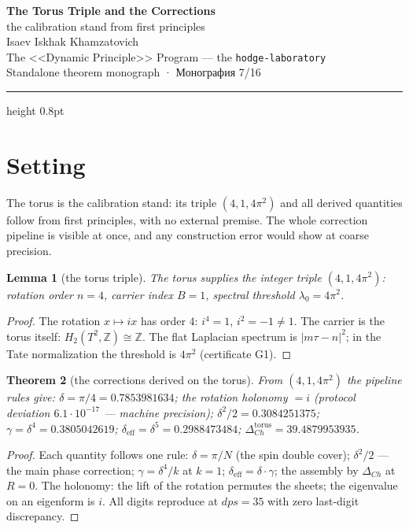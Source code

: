 \documentclass[11pt,a4paper]{article}
\theoremstyle{plain}
\newtheorem{theorem}{Theorem}
\newtheorem{lemma}[theorem]{Lemma}
\theoremstyle{definition}
\theoremstyle{remark}
\newcommand{\ZZ}{\mathbb{Z}}
\begin{document}
\begin{center}
{\LARGE\bfseries The Torus Triple and the Corrections}\\[0.4em]
{\large the calibration stand from first principles}\\[0.6em]
{\normalsize Isaev Iskhak Khamzatovich}\\[0.2em]
{\normalsize The <<Dynamic Principle>> Program --- the \texttt{hodge-laboratory}}\\[0.15em]
{\small Standalone theorem monograph · Монография 7/16}
\end{center}
\vspace{0.4em}
{\color{linkblue}\hrule height 0.8pt}
\vspace{0.8em}

\section{Setting}

The torus is the calibration stand: its triple $(4,1,4\pi^2)$ and
all derived quantities follow from first principles, with no
external premise. The whole correction pipeline is visible at once,
and any construction error would show at coarse precision.

\begin{lemma}[the torus triple]\label{lem:torus}
The torus supplies the integer triple $(4,1,4\pi^2)$: rotation
order $n=4$, carrier index $B=1$, spectral threshold
$\lambda_0=4\pi^2$.
\end{lemma}

\begin{proof}
The rotation $x\mapsto ix$ has order $4$: $i^4=1$, $i^2=-1\ne1$.
The carrier is the torus itself: $H_2(T^2,\ZZ)\cong\ZZ$. The flat
Laplacian spectrum is $|m\tau-n|^2$; in the Tate normalization the
threshold is $4\pi^2$ (certificate G1).
\end{proof}

\begin{theorem}[the corrections derived on the torus]\label{th:toruscorr}
From $(4,1,4\pi^2)$ the pipeline rules give:
$\delta=\pi/4=0.7853981634$; the rotation holonomy $=i$ (protocol
deviation $6.1\cdot10^{-17}$ --- machine precision);
$\delta^2/2=0.3084251375$; $\gamma=\delta^4=0.3805042619$;
$\delta_{\mathrm{eff}}=\delta^5=0.2988473484$;
$\Delta_{Ch}^{\mathrm{torus}}=39.4879953935$.
\end{theorem}

\begin{proof}
Each quantity follows one rule: $\delta=\pi/N$ (the spin double
cover); $\delta^2/2$ --- the main phase correction;
$\gamma=\delta^4/k$ at $k=1$; $\delta_{\mathrm{eff}}
=\delta\cdot\gamma$; the assembly by $\Delta_{Ch}$ at $R=0$. The
holonomy: the lift of the rotation permutes the sheets; the
eigenvalue on an eigenform is $i$. All digits reproduce at $dps=35$
with zero last-digit discrepancy.
\end{proof}
\end{document}
